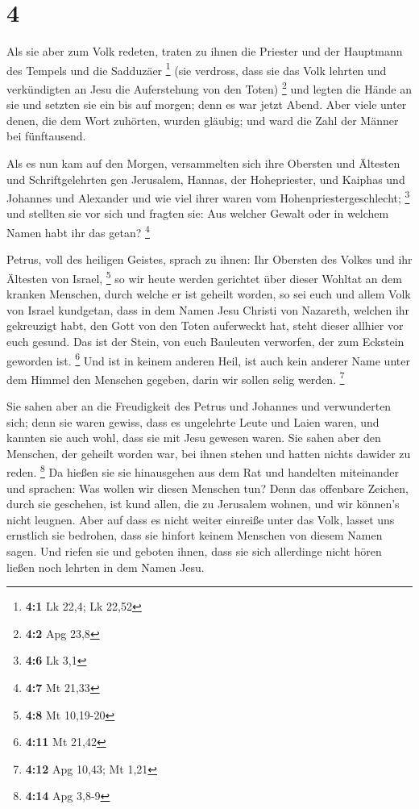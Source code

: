 \hypertarget{section-1}{%
\section{4}\label{section-1}}

 Als sie aber zum Volk redeten, traten zu ihnen die Priester
und der Hauptmann des Tempels und die Sadduzäer \footnote{\textbf{4:1}
  Lk 22,4; Lk 22,52}  (sie verdross, dass sie das Volk
lehrten und verkündigten an Jesu die Auferstehung von den Toten)
\footnote{\textbf{4:2} Apg 23,8}  und legten die Hände an
sie und setzten sie ein bis auf morgen; denn es war jetzt Abend.
 Aber viele unter denen, die dem Wort zuhörten, wurden
gläubig; und ward die Zahl der Männer bei fünftausend.

 Als es nun kam auf den Morgen, versammelten sich ihre
Obersten und Ältesten und Schriftgelehrten gen Jerusalem, 
Hannas, der Hohepriester, und Kaiphas und Johannes und Alexander und wie
viel ihrer waren vom Hohenpriestergeschlecht; \footnote{\textbf{4:6} Lk
  3,1}  und stellten sie vor sich und fragten sie: Aus
welcher Gewalt oder in welchem Namen habt ihr das getan? \footnote{\textbf{4:7}
  Mt 21,33}

 Petrus, voll des heiligen Geistes, sprach zu ihnen: Ihr
Obersten des Volkes und ihr Ältesten von Israel, \footnote{\textbf{4:8}
  Mt 10,19-20}  so wir heute werden gerichtet über dieser
Wohltat an dem kranken Menschen, durch welche er ist geheilt worden,
 so sei euch und allem Volk von Israel kundgetan, dass in
dem Namen Jesu Christi von Nazareth, welchen ihr gekreuzigt habt, den
Gott von den Toten auferweckt hat, steht dieser allhier vor euch gesund.
 Das ist der Stein, von euch Bauleuten verworfen, der zum
Eckstein geworden ist. \footnote{\textbf{4:11} Mt 21,42} 
Und ist in keinem anderen Heil, ist auch kein anderer Name unter dem
Himmel den Menschen gegeben, darin wir sollen selig werden. \footnote{\textbf{4:12}
  Apg 10,43; Mt 1,21}

 Sie sahen aber an die Freudigkeit des Petrus und Johannes
und verwunderten sich; denn sie waren gewiss, dass es ungelehrte Leute
und Laien waren, und kannten sie auch wohl, dass sie mit Jesu gewesen
waren.  Sie sahen aber den Menschen, der geheilt worden
war, bei ihnen stehen und hatten nichts dawider zu reden. \footnote{\textbf{4:14}
  Apg 3,8-9}  Da hießen sie sie hinausgehen aus dem Rat und
handelten miteinander und sprachen:  Was wollen wir diesen
Menschen tun? Denn das offenbare Zeichen, durch sie geschehen, ist kund
allen, die zu Jerusalem wohnen, und wir können's nicht leugnen.
 Aber auf dass es nicht weiter einreiße unter das Volk,
lasset uns ernstlich sie bedrohen, dass sie hinfort keinem Menschen von
diesem Namen sagen.  Und riefen sie und geboten ihnen, dass
sie sich allerdinge nicht hören ließen noch lehrten in dem Namen Jesu.

